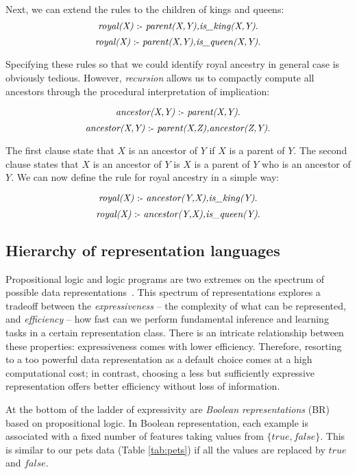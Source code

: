 Next, we can extend the rules to the children of kings and queens:
$$ \text{\textit{royal(X)}} \text{ :- } \text{\textit{parent(X,Y),is\_king(X,Y)}}.$$
$$ \text{\textit{royal(X)}} \text{ :- } \text{\textit{parent(X,Y),is\_queen(X,Y)}}.$$

Specifying these rules so that we could identify royal ancestry in general case is obviously tedious.
However, \textit{recursion} allows us to compactly compute all ancestors through the procedural interpretation of implication:

$$ \text{\textit{ancestor(X,Y)}} \text{ :- } \textit{parent(X,Y)}.$$
$$ \text{\textit{ancestor(X,Y)}} \text{ :- } \textit{parent(X,Z),ancestor(Z,Y)}.$$

The first clause state that $X$ is an ancestor of $Y$ if $X$ is a parent of $Y$.
The second clause states that $X$ is an ancestor of $Y$ is $X$ is a parent of $Y$ who is an ancestor of $Y$.
We can now define the rule for royal ancestry in a simple way:

$$ \text{\textit{royal(X)}} \text{ :- } \text{\textit{ancestor(Y,X),is\_king(Y)}}.$$
$$ \text{\textit{royal(X)}} \text{ :- } \text{\textit{ancestor(Y,X),is\_queen(Y)}}.$$












\subsection{Hierarchy of representation languages}



Propositional logic and logic programs are two extremes on the spectrum of possible data representations~\cite{LucRLbook}.
This spectrum of representations explores a tradeoff between the \textit{expressiveness} -- the complexity of what can be represented, and \textit{efficiency} -- how fast can we perform fundamental inference and learning tasks in a certain representation class.
There is an intricate relationship between these properties: expressiveness comes with lower efficiency.
Therefore, resorting to a too powerful data representation as a default choice comes at a high computational cost; in contrast, choosing a less but sufficiently expressive representation offers better efficiency  without loss of information.


At the bottom of the ladder of expressivity are \textit{Boolean representations} (BR) based on propositional logic.
In Boolean representation, each example is associated with a fixed number of features taking values from $\{true, false\}$.
This is similar to our pets data (Table \ref{tab:pets})  if all the values are replaced by $true$ and $false$.


